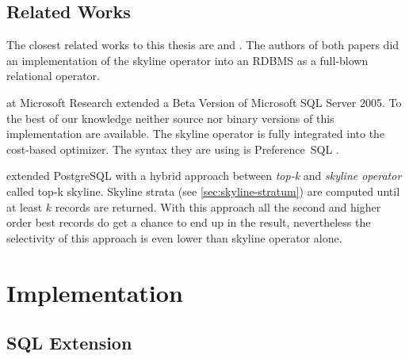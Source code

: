 \section{Related Works}
The closest related works to this thesis are \citep{Chaudhuri2006}
and \citep{Goncalves2005, Goncalves2005a}.  The authors of both papers did an
implementation of the skyline operator into an RDBMS as a full-blown
relational operator.

\citet{Chaudhuri2006} at Microsoft Research extended a Beta
Version of Microsoft SQL Server 2005.  To the best of our knowledge
neither source nor binary versions of this implementation are
available.  The skyline operator is fully integrated into the
cost-based optimizer.  The syntax they are using is Preference~SQL 
\citep{Kiessling2002a}.


\citep{Goncalves2005} extended PostgreSQL with a hybrid approach 
between \emph{top-k} and \emph{skyline operator} called top-k skyline.
Skyline strata (see \autoref{sec:skyline-stratum}) are computed until
at least $k$ records are returned.  With this approach all the second
and higher order best records do get a chance to end up in the result,
nevertheless the selectivity of this approach is even lower than
skyline operator alone.






\chapter{Implementation}
\label{chap:implementation}
\section{SQL Extension}
\label{sec:sql-extension}

\enlargethispage{\baselineskip}

